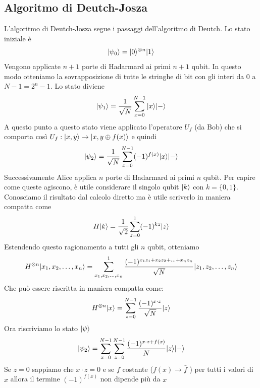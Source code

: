 \documentclass[12pt, a4paper]{report}
\begin{document}
\subsection{Algoritmo di Deutch-Josza}
L'algoritmo di Deutch-Josza segue i passaggi dell'algoritmo di Deutch. Lo stato iniziale è
\begin{equation*}
    | \psi_{0} \rangle = | 0 \rangle^{\otimes n}| 1 \rangle
\end{equation*}
Vengono applicate $n+1$ porte di Hadarmard ai primi $n+1$ qubit. In questo modo otteniamo la sovrapposizione di tutte le stringhe di bit con gli interi da 0 a $N-1 = 2^{n}-1$. Lo stato diviene
\begin{equation*}
    | \psi_{1} \rangle = \frac{1}{\sqrt{N}}\sum_{x=0}^{N-1}| x \rangle| - \rangle
\end{equation*} 
A questo punto a questo stato viene applicato l'operatore $U_{f}$ (da Bob) che si comporta così $U_{f}:| x,y \rangle\rightarrow| x,y\oplus f(x) \rangle$  e quindi
\begin{equation*}
    | \psi_{2} \rangle = \frac{1}{\sqrt{N}}\sum_{x=0}^{N-1}(-1)^{f(x)}| x \rangle| - \rangle
\end{equation*}
Successivamente Alice applica $n$ porte di Hadarmard ai primi $n$ qubit. Per capire come queste agiscono, è utile considerare il singolo qubit $| k \rangle$ con $k=\{0,1\}$. Conosciamo il risultato dal calcolo diretto ma è utile scriverlo in maniera compatta come
\begin{equation*}
    H| k \rangle = \frac{1}{\sqrt{2}}\sum_{z=0}^{1}(-1)^{kz}| z \rangle
\end{equation*}
Estendendo questo ragionamento a tutti gli $n$ qubit, otteniamo
\begin{equation*}
    H^{\otimes n}| x_{1},x_{2},\ldots,x_{n} \rangle = \sum_{x_{1},x_{2},\ldots,x_{n}}^{1}\frac{(-1)^{x_{1}z_{1}+x_{2}z_{2}+\ldots+x_{n}z_{n}}}{\sqrt{N}}| z_{1},z_{2},\ldots,z_{n} \rangle
\end{equation*}
Che può essere riscritta in maniera compatta come:
\begin{equation*}
    H^{\otimes n}| x \rangle = \sum_{z=0}^{N-1}\frac{(-1)^{x\cdot z}}{\sqrt{N}}| z \rangle
\end{equation*}
Ora riscriviamo lo stato $| \psi \rangle$
\begin{equation*}
    | \psi_{2} \rangle = \sum_{x=0}^{N-1}\sum_{z=0}^{N-1} \frac{(-1)^{x\cdot z + f(x)}}{N}| z \rangle| - \rangle
\end{equation*}
Se $z=0$ sappiamo che $x\cdot z = 0$ e se $f$ costante ($f(x)\rightarrow \bar{f}$ ) per tutti i valori di $x$ allora il termine $(-1)^{f(x)}$ non dipende più da $x$
\end{document}
